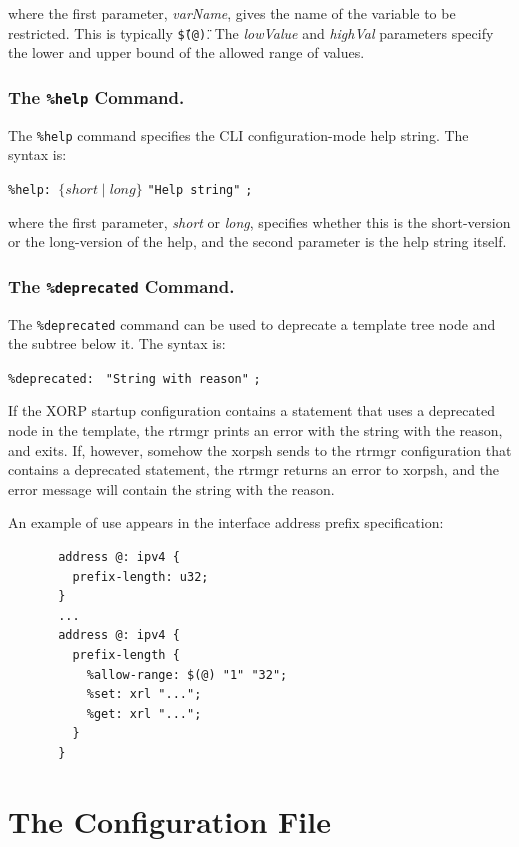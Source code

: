\documentclass[11pt]{article}
\begin{document}
\noindent where the first parameter, \textit{varName}, gives the name
of the variable to be restricted.  This is typically
\texttt{\"\$(@)\"}.  The {\it lowValue} and {\it highVal} parameters
specify the lower and upper bound of the allowed range of values.

\subsubsection{The {\tt \%help} Command.}

The {\tt \%help} command specifies the CLI configuration-mode help string.
The syntax is:

\texttt{\%help: }{$\{short \mid long\}$} \texttt{"Help string"} \texttt{;}

\noindent where the first parameter, \textit{short} or \textit{long},
specifies whether this is the short-version or the long-version of the
help, and the second parameter is the help string itself.

\subsubsection{The {\tt \%deprecated} Command.}

The {\tt \%deprecated} command can be used to deprecate a template tree
node and the subtree below it.
The syntax is:

\texttt{\%deprecated: } \texttt{"String with reason"} \texttt{;}

If the XORP startup configuration contains a statement that uses a
deprecated node in the template, the rtrmgr prints an error with
the string with the reason, and exits.
If, however, somehow the xorpsh sends to the rtrmgr configuration
that contains a deprecated statement, the rtrmgr returns an error to xorpsh,
and the error message will contain the string with the reason.

\newpage

An example of use appears in the interface address prefix
specification:

\begin{verbatim}
       address @: ipv4 {
         prefix-length: u32;
       }
       ...
       address @: ipv4 {
         prefix-length {
           %allow-range: $(@) "1" "32";
           %set: xrl "...";
           %get: xrl "...";
         }
       }
\end{verbatim}

\newpage

\section{The Configuration File}
\end{document}
